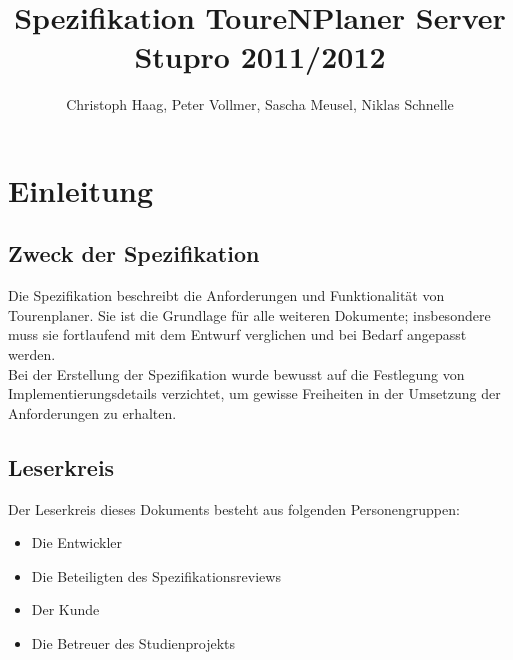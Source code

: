 \documentclass[a4paper,10pt,titlepage]{article}
\author{Christoph Haag, Peter Vollmer, Sascha Meusel, Niklas Schnelle}
\title{Spezifikation ToureNPlaner Server\\ Stupro 2011/2012}
\begin{document}
\maketitle
{}
\setcounter{page}{1}
\tableofcontents
\clearpage
{}
\setcounter{page}{1}

\section{Einleitung}
\subsection{Zweck der Spezifikation}
Die Spezifikation beschreibt die Anforderungen und Funktionalität von Tourenplaner. Sie ist die Grundlage für alle weiteren Dokumente; insbesondere muss sie fortlaufend mit dem Entwurf verglichen und bei Bedarf angepasst werden.\\
Bei der Erstellung der Spezifikation wurde bewusst auf die Festlegung von Implementierungsdetails verzichtet, um gewisse Freiheiten in der Umsetzung der Anforderungen zu erhalten.

\subsection{Leserkreis}
Der Leserkreis dieses Dokuments besteht aus folgenden Personengruppen:
\begin{itemize}
\item Die Entwickler
\item Die Beteiligten des Spezifikationsreviews
\item Der Kunde
\item Die Betreuer des Studienprojekts
\end{itemize}
\end{document}
